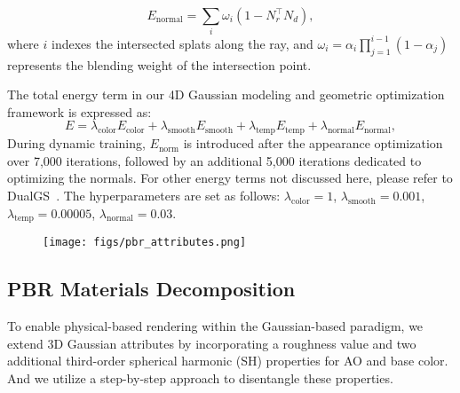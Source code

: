 \begin{equation}
E_{\text{normal}} = \sum_i \omega_i (1 - N_r^\top N_d),
\end{equation}
where $i$ indexes the intersected splats along the ray, and $\omega_i=\alpha_i \prod_{j=1}^{i-1} (1 - \alpha_j)$ represents the blending weight of the intersection point.

The total energy term in our 4D Gaussian modeling and geometric optimization framework is expressed as:
\begin{equation}
    E = \lambda_{\text{color}}E_{\text{color}}+\lambda_{\text{smooth}}E_{\text{smooth}}+\lambda_{\text{temp}}E_{\text{temp}}+\lambda_{\text{normal}}E_{\text{normal}},
\end{equation}
During dynamic training, $E_{\text{norm}}$ is introduced after the appearance optimization over 7,000 iterations, followed by an additional 5,000 iterations dedicated to optimizing the normals. For other energy terms not discussed here, please refer to DualGS~\cite{jiang2024robust}. The hyperparameters are set as follows: $\lambda_{\text{color}} = 1$, $ \lambda_{\text{smooth}} = 0.001$, $\lambda_{\text{temp}} = 0.00005$, $\lambda_{\text{normal}} = 0.03$.















\begin{figure}[t]
  \texttt{[image: figs/pbr\_attributes.png]}
  \label{fig_pbr_attributes}
  \vspace{-15pt}
\end{figure}



\subsection{PBR Materials Decomposition}
\label{sec_3_2}

To enable physical-based rendering within the Gaussian-based paradigm, we extend 3D Gaussian attributes by incorporating a roughness value and two additional third-order spherical harmonic (SH) properties for AO and base color. And we utilize a step-by-step approach to disentangle these properties.















